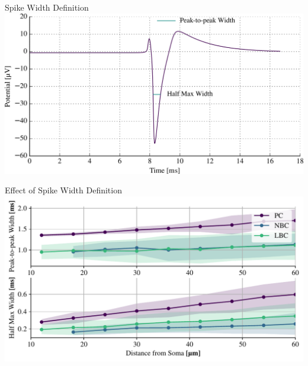 \documentclass{beamer}
\begin{document}
\begin{frame}{Spike Width Definition}
    \centering
    \includegraphics[width=\textwidth]{images/width_good.png}
\end{frame}

\begin{frame}{Effect of Spike Width Definition}
    \centering
    \includegraphics[width=\textwidth]{images/TTPC2_NBC_LBC_widths.pdf}
\end{frame}
\end{document}
